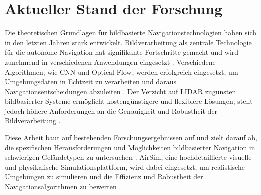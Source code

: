 \section{Aktueller Stand der Forschung}

Die theoretischen Grundlagen für bildbasierte Navigationstechnologien haben sich in den letzten Jahren stark entwickelt. 
Bildverarbeitung als zentrale Technologie für die autonome Navigation hat signifikante Fortschritte gemacht und wird zunehmend in verschiedenen Anwendungen eingesetzt \cite{image:processing:uav:autonomous,multi:objective:ugv:navigation}. 
Verschiedene Algorithmen, wie \ac{CNN} und Optical Flow, werden erfolgreich eingesetzt, um Umgebungsdaten in Echtzeit zu verarbeiten und daraus Navigationsentscheidungen abzuleiten \cite{autonomous:flight:uwb:positioning,mapless:ugv:navigation}. 
Der Verzicht auf \gls{LIDAR} zugunsten bildbasierter Systeme ermöglicht kostengünstigere und flexiblere Lösungen, stellt jedoch höhere Anforderungen an die Genauigkeit und Robustheit der Bildverarbeitung \cite{website:tesla:suppport}.

Diese Arbeit baut auf bestehenden Forschungsergebnissen auf und zielt darauf ab, die spezifischen Herausforderungen und Möglichkeiten bildbasierter Navigation in schwierigen Geländetypen zu untersuchen \cite{mapless:ugv:navigation,ugv:coverage:energy:efficient}. 
AirSim, eine hochdetaillierte visuelle und physikalische Simulationsplattform, wird dabei eingesetzt, um realistische Umgebungen zu simulieren und die Effizienz und Robustheit der Navigationsalgorithmen zu bewerten \cite{airsim2017fsr}.


